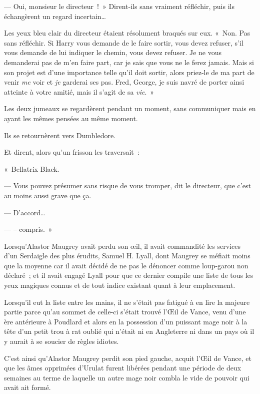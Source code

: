 --- Oui, monsieur le directeur~!~» Dirent-ils sans vraiment réfléchir, puis ils échangèrent un regard incertain…

Les yeux bleu clair du directeur étaient résolument braqués sur eux. «~Non. Pas sans réfléchir. Si Harry vous demande de le faire sortir, vous devez refuser, s'il vous demande de lui indiquer le chemin, vous devez refuser. Je ne vous demanderai pas de m'en faire part, car je sais que vous ne le ferez jamais. Mais si son projet est d'une importance telle qu'il doit sortir, alors priez-le de ma part de venir \emph{me} voir et \emph{je} garderai ses pas. Fred, George, je suis navré de porter ainsi atteinte à votre amitié, mais il s'agit de sa \emph{vie}.~»

Les deux jumeaux se regardèrent pendant un moment, sans communiquer mais en ayant les mêmes pensées au même moment.

Ils se retournèrent vers Dumbledore.

Et dirent, alors qu'un frisson les traversait~:

«~Bellatrix Black.

--- Vous pouvez présumer sans risque de vous tromper, dit le directeur, que c'est au moins aussi grave que ça.

--- D'accord…

--- -- compris.~»


Lorsqu'Alastor Maugrey avait perdu son œil, il avait commandité les services d'un Serdaigle des plus érudits, Samuel H. Lyall, dont Maugrey se méfiait moins que la moyenne car il avait décidé de ne pas le dénoncer comme loup-garou non déclaré~; et il avait engagé Lyall pour que ce dernier compile une liste de tous les yeux magiques connus et de tout indice existant quant à leur emplacement.

Lorsqu'il eut la liste entre les mains, il ne s'était pas fatigué à en lire la majeure partie parce qu'au sommet de celle-ci s'était trouvé l'Œil de Vance, venu d'une ère antérieure à Poudlard et alors en la possession d'un puissant mage noir à la tête d'un petit trou à rat oublié qui n'était ni en Angleterre ni dans un pays où il y aurait à se soucier de règles idiotes.

C'est ainsi qu'Alastor Maugrey perdit son pied gauche, acquit l'Œil de Vance, et que les âmes opprimées d'Urulat furent libérées pendant une période de deux semaines au terme de laquelle un autre mage noir combla le vide de pouvoir qui avait ait formé.

